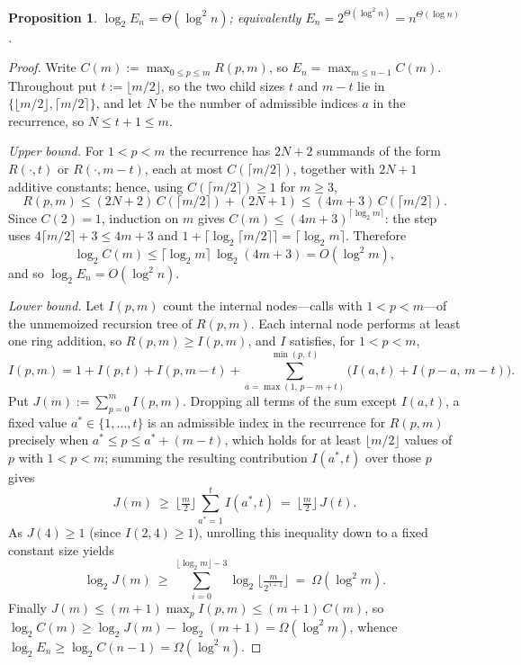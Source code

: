 \documentclass{amsart}
\newtheorem{proposition}[lemma]{Proposition}
\theoremstyle{definition}
\theoremstyle{remark}
\numberwithin{equation}{section}
\begin{document}
\begin{proposition} \label{prop:elemcost}
$\log_2 E_n=\Theta(\log^2 n)$; equivalently $E_n=2^{\Theta(\log^2 n)}=n^{\Theta(\log n)}$.
\end{proposition}
\begin{proof}
Write $C(m):=\max_{0\leq p\leq m}R(p,m)$, so $E_n=\max_{m\leq n-1}C(m)$. Throughout put $t:=\lfloor m/2\rfloor$, so the two child sizes $t$ and $m-t$ lie in $\{\lfloor m/2\rfloor,\lceil m/2\rceil\}$, and let $N$ be the number of admissible indices $a$ in the recurrence, so $N\leq t+1\leq m$.

\emph{Upper bound.} For $1<p<m$ the recurrence has $2N+2$ summands of the form $R(\cdot,t)$ or $R(\cdot,m-t)$, each at most $C(\lceil m/2\rceil)$, together with $2N+1$ additive constants; hence, using $C(\lceil m/2\rceil)\geq 1$ for $m\geq 3$,
$$R(p,m)\leq (2N+2)\,C(\lceil m/2\rceil)+(2N+1)\leq (4m+3)\,C(\lceil m/2\rceil).$$
Since $C(2)=1$, induction on $m$ gives $C(m)\leq (4m+3)^{\lceil\log_2 m\rceil}$: the step uses $4\lceil m/2\rceil+3\leq 4m+3$ and $1+\lceil\log_2\lceil m/2\rceil\rceil=\lceil\log_2 m\rceil$. Therefore
$$\log_2 C(m)\leq \lceil\log_2 m\rceil\,\log_2(4m+3)=O(\log^2 m),$$
and so $\log_2 E_n=O(\log^2 n)$.

\emph{Lower bound.} Let $I(p,m)$ count the internal nodes---calls with $1<p<m$---of the unmemoized recursion tree of $R(p,m)$. Each internal node performs at least one ring addition, so $R(p,m)\geq I(p,m)$, and $I$ satisfies, for $1<p<m$,
$$I(p,m)=1+I(p,t)+I(p,m-t)+\sum_{a=\max(1,\,p-m+t)}^{\min(p,\,t)}\bigl(I(a,t)+I(p-a,\,m-t)\bigr).$$
Put $J(m):=\sum_{p=0}^{m}I(p,m)$. Dropping all terms of the sum except $I(a,t)$, a fixed value $a^\ast\in\{1,\dots,t\}$ is an admissible index in the recurrence for $R(p,m)$ precisely when $a^\ast\leq p\leq a^\ast+(m-t)$, which holds for at least $\lfloor m/2\rfloor$ values of $p$ with $1<p<m$; summing the resulting contribution $I(a^\ast,t)$ over those $p$ gives
$$J(m)\ \geq\ \Big\lfloor\tfrac m2\Big\rfloor\sum_{a^\ast=1}^{t}I(a^\ast,t)\ =\ \Big\lfloor\tfrac m2\Big\rfloor\,J(t).$$
As $J(4)\geq 1$ (since $I(2,4)\geq 1$), unrolling this inequality down to a fixed constant size yields
$$\log_2 J(m)\ \geq\ \sum_{i=0}^{\lfloor\log_2 m\rfloor-3}\log_2\Big\lfloor\tfrac{m}{2^{\,i+1}}\Big\rfloor\ =\ \Omega(\log^2 m).$$
Finally $J(m)\leq (m+1)\max_p I(p,m)\leq (m+1)\,C(m)$, so $\log_2 C(m)\geq \log_2 J(m)-\log_2(m+1)=\Omega(\log^2 m)$, whence $\log_2 E_n\geq \log_2 C(n-1)=\Omega(\log^2 n)$.
\end{proof}
\end{document}
